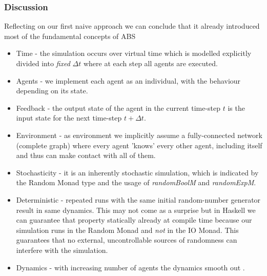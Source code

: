 %    	

\subsubsection{Discussion}
Reflecting on our first naive approach we can conclude that it already introduced most of the fundamental concepts of ABS
\begin{itemize}
	\item Time - the simulation occurs over virtual time which is modelled explicitly divided into \textit{fixed} $\Delta t$ where at each step all agents are executed.
	\item Agents - we implement each agent as an individual, with the behaviour depending on its state.
	\item Feedback - the output state of the agent in the current time-step $t$ is the input state for the next time-step $t + \Delta t$.
	\item Environment - as environment we implicitly assume a fully-connected network (complete graph) where every agent 'knows' every other agent, including itself and thus can make contact with all of them.
	\item Stochasticity - it is an inherently stochastic simulation, which is indicated by the Random Monad type and the usage of \textit{randomBoolM} and \textit{randomExpM}.
	\item Deterministic - repeated runs with the same initial random-number generator result in same dynamics. This may not come as a surprise but in Haskell we can guarantee that property statically already at compile time because our simulation runs in the Random Monad and \textit{not} in the IO Monad. This guarantees that no external, uncontrollable sources of randomness can interfere with the simulation.
	\item Dynamics - with increasing number of agents the dynamics smooth out \cite{macal_agent-based_2010}.
\end{itemize}

